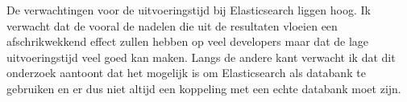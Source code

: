 \documentclass[fleqn,10pt]{voorstel}
\begin{document}
	De verwachtingen voor de uitvoeringstijd bij Elasticsearch liggen hoog. Ik verwacht dat de vooral de nadelen die uit de resultaten vloeien een afschrikwekkend effect zullen hebben op veel developers maar dat de lage uitvoeringstijd veel goed kan maken. Langs de andere kant verwacht ik dat dit onderzoek aantoont dat het mogelijk is om Elasticsearch als databank te gebruiken en er dus niet altijd een koppeling met een echte databank moet zijn.
	
	
	\printbibliography[heading=bibintoc]
	
\end{document}
